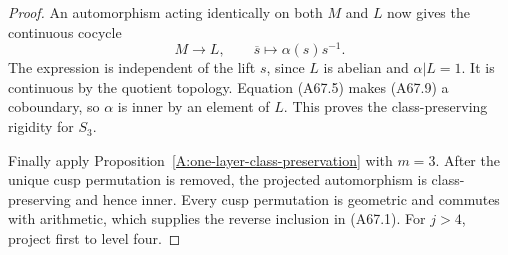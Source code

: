 \begin{proof}
An automorphism acting identically on both
$M$ and $L$ now gives the continuous cocycle
\[
 M\longrightarrow L,\qquad
   \overline s\longmapsto\alpha(s)s^{-1}.
                                                        \tag{A67.9}
\]
The expression is independent of the
lift $s$, since $L$ is abelian and
$\alpha|L=1$. It is continuous by
the quotient topology.
Equation (A67.5) makes (A67.9) a coboundary,
so $\alpha$ is inner by an element of $L$.
This proves the class-preserving rigidity
for $S_3$.

Finally apply
Proposition~\ref{A:one-layer-class-preservation}
with $m=3$. After the unique cusp permutation
is removed, the projected automorphism is
class-preserving and hence inner.
Every cusp permutation is geometric and
commutes with arithmetic, which supplies
the reverse inclusion in (A67.1).
For $j>4$, project first to level four.
\end{proof}
